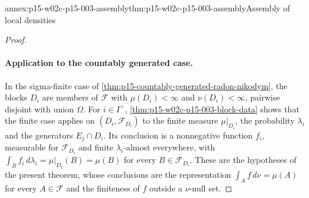 \begin{annexitem}{annex:p15-w02c-p15-003-assembly}{thm:p15-w02c-p15-003-assembly}{Assembly of local densities}
\begin{proof}
\paragraph{Application to the countably generated case.}
In the sigma-finite case of \cref{thm:p15-countably-generated-radon-nikodym},
the blocks \(D_i\) are members of \(\mathcal F\) with
\(\mu(D_i)<\infty\) and \(\nu(D_i)<\infty\), pairwise disjoint with union
\(\Omega\). For \(i\in I^+\), \cref{thm:p15-w02c-p15-003-block-data}
shows that the finite case applies on \((D_i,\mathcal F_{D_i})\) to the
finite measure \(\mu|_{D_i}\), the probability \(\lambda_i\) and the
generators \(E_j\cap D_i\). Its conclusion is a nonnegative function
\(f_i\), measurable for \(\mathcal F_{D_i}\) and finite
\(\lambda_i\)-almost everywhere, with
\(\int_Bf_i\,d\lambda_i=\mu|_{D_i}(B)=\mu(B)\) for every
\(B\in\mathcal F_{D_i}\). These are the hypotheses of the present theorem,
whose conclusions are the representation
\(\int_Af\,d\nu=\mu(A)\) for every \(A\in\mathcal F\) and the finiteness of
\(f\) outside a \(\nu\)-null set.
\end{proof}
\end{annexitem}
